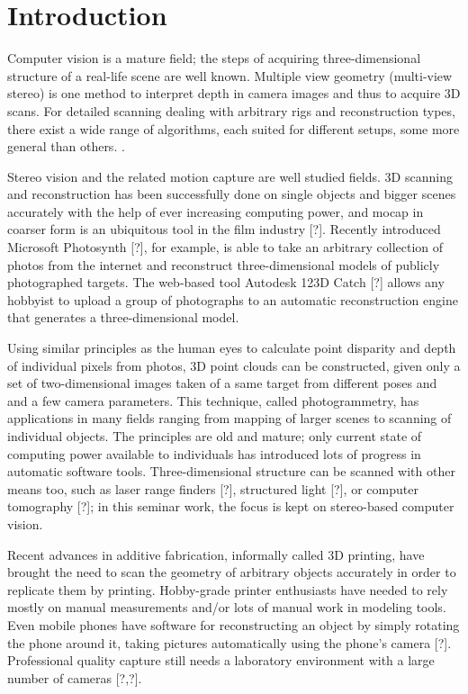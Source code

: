 \section{Introduction}
\thispagestyle{empty}

Computer vision is a mature field; the steps of acquiring three-dimensional structure of a real-life scene are well known.
Multiple view geometry (multi-view stereo) is one method to interpret depth in camera images and thus to acquire 3D scans.
\cite{hartley03multiview,szeliski10vision,trucco1998introductory}
For detailed scanning dealing with arbitrary rigs and reconstruction types, there exist a wide range of algorithms, each suited for different setups, some more general than others.
\cite{seitz2006comparison}.

Stereo vision and the related motion capture are well studied fields.
3D scanning and reconstruction has been successfully done on single objects and bigger scenes accurately with the help of ever increasing computing power,
\cite{goesele2007multi,furukawa2010towards,pollefeys1999hand}
and mocap in coarser form is an ubiquitous tool in the film industry [?].
Recently introduced Microsoft Photosynth [?], for example, is able to take an arbitrary collection of photos from the internet and reconstruct three-dimensional models of publicly photographed targets.
The web-based tool Autodesk 123D Catch [?] allows any hobbyist to upload a group of photographs to an automatic reconstruction engine that generates a three-dimensional model.

Using similar principles as the human eyes to calculate point disparity and depth of individual pixels from photos, 3D point clouds can be constructed, given only a set of two-dimensional images taken of a same target from different poses and and a few camera parameters.
\cite{hartley03multiview}
This technique, called photogrammetry, has applications in many fields ranging from mapping of larger scenes to scanning of individual objects.
The principles are old and mature; only current state of computing power available to individuals has introduced lots of progress in automatic software tools.
Three-dimensional structure can be scanned with other means too, such as laser range finders [?], structured light [?], or computer tomography [?]; in this seminar work, the focus is kept on stereo-based computer vision.

Recent advances in additive fabrication, informally called 3D printing, have brought the need to scan the geometry of arbitrary objects accurately in order to replicate them by printing.
Hobby-grade printer enthusiasts have needed to rely mostly on manual measurements and/or lots of manual work in modeling tools.
Even mobile phones have software for reconstructing an object by simply rotating the phone around it, taking pictures automatically using the phone's camera [?]. Professional quality capture still needs a laboratory environment with a large number of cameras [?,?].

